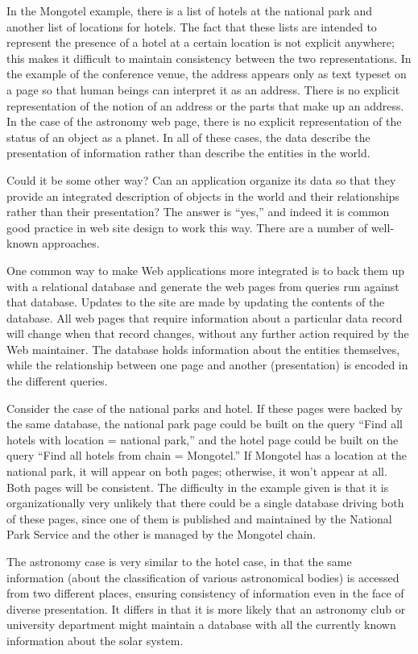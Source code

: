 In the Mongotel example, there is a list of hotels at the national park
and another list of locations for hotels. The fact that these lists are
intended to represent the presence of a hotel at a certain location is
not explicit anywhere; this makes it difficult to maintain consistency
between the two representations. In the example of the conference venue,
the address appears only as text typeset on a page so that human beings
can interpret it as an address. There is no explicit representation of
the notion of an address or the parts that make up an address. In the
case of the astronomy web page, there is no explicit representation of
the status of an object as a planet. In all of these cases, the data
describe the presentation of information rather than describe the
entities in the world.

Could it be some other way? Can an application organize its data so that
they provide an integrated description of objects in the world and their
relationships rather than their presentation? The answer is ``yes,'' and
indeed it is common good practice in web site design to work this way.
There are a number of well-known approaches.

One common way to make Web applications more integrated is to back them
up with a relational database and generate the web pages from queries
run against that database. Updates to the site are made by updating the
contents of the database. All web pages that require information about a
particular data record will change when that record changes, without any
further action required by the Web maintainer. The database holds
information about the entities themselves, while the relationship
between one page and another (presentation) is encoded in the different
queries.

Consider the case of the national parks and hotel. If these pages were
backed by the same database, the national park page could be built on
the query ``Find all hotels with location = national park,'' and the
hotel page could be built on the query ``Find all hotels from chain =
Mongotel.'' If Mongotel has a location at the national park, it will
appear on both pages; otherwise, it won't appear at all. Both pages will
be consistent. The difficulty in the example given is that it is
organizationally very unlikely that there could be a single database
driving both of these pages, since one of them is published and
maintained by the National Park Service and the other is managed by the
Mongotel chain.

The astronomy case is very similar to the hotel case, in that the same
information (about the classification of various astronomical bodies) is
accessed from two different places, ensuring consistency of information
even in the face of diverse presentation. It differs in that it is more
likely that an astronomy club or university department might maintain a
database with all the currently known information about the solar
system.

